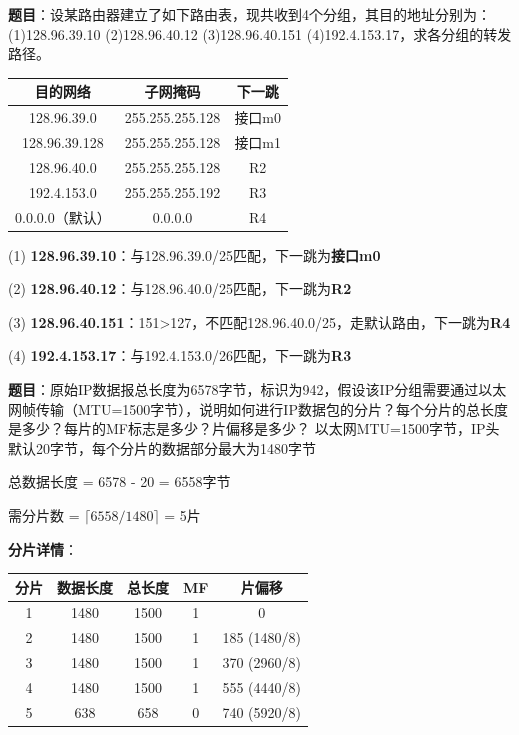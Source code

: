 \begin{examplebox}
\textbf{题目}：设某路由器建立了如下路由表，现共收到4个分组，其目的地址分别为：(1)128.96.39.10 (2)128.96.40.12 (3)128.96.40.151 (4)192.4.153.17，求各分组的转发路径。

\begin{center}\small
\begin{tabular}{|c|c|c|}
\hline
目的网络 & 子网掩码 & 下一跳 \\
\hline
128.96.39.0 & 255.255.255.128 & 接口m0 \\
128.96.39.128 & 255.255.255.128 & 接口m1 \\
128.96.40.0 & 255.255.255.128 & R2 \\
192.4.153.0 & 255.255.255.192 & R3 \\
0.0.0.0（默认） & 0.0.0.0 & R4 \\
\hline
\end{tabular}
\end{center}
\tcblower
(1) \textbf{128.96.39.10}：与128.96.39.0/25匹配，下一跳为\textbf{接口m0}

(2) \textbf{128.96.40.12}：与128.96.40.0/25匹配，下一跳为\textbf{R2}

(3) \textbf{128.96.40.151}：151>127，不匹配128.96.40.0/25，走默认路由，下一跳为\textbf{R4}

(4) \textbf{192.4.153.17}：与192.4.153.0/26匹配，下一跳为\textbf{R3}
\end{examplebox}

\begin{examplebox}
\textbf{题目}：原始IP数据报总长度为6578字节，标识为942，假设该IP分组需要通过以太网帧传输（MTU=1500字节），说明如何进行IP数据包的分片？每个分片的总长度是多少？每片的MF标志是多少？片偏移是多少？
\tcblower
以太网MTU=1500字节，IP头默认20字节，每个分片的数据部分最大为1480字节

总数据长度 = 6578 - 20 = 6558字节

需分片数 = $\lceil 6558/1480 \rceil$ = 5片

\textbf{分片详情}：
\begin{center}\small
\begin{tabular}{|c|c|c|c|c|}
\hline
分片 & 数据长度 & 总长度 & MF & 片偏移 \\
\hline
1 & 1480 & 1500 & 1 & 0 \\
2 & 1480 & 1500 & 1 & 185 (1480/8) \\
3 & 1480 & 1500 & 1 & 370 (2960/8) \\
4 & 1480 & 1500 & 1 & 555 (4440/8) \\
5 & 638 & 658 & 0 & 740 (5920/8) \\
\hline
\end{tabular}
\end{center}
\end{examplebox}


